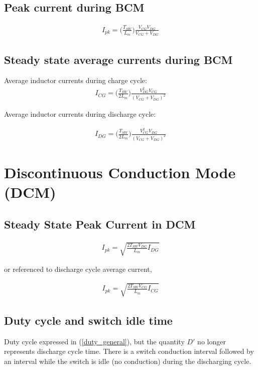 \documentclass{scrartcl}
\begin{document}
		\subsection{Peak current during BCM}
		
			\begin{align}
			I_{pk} = \bigg(\frac{T_{SW}}{L_m}\bigg)\frac{V_{CG}V_{DG}}{V_{CG} + V_{DG}} 
			\end{align}	
			
		\subsection{Steady state average currents during BCM}
			Average inductor currents during charge cycle:
			\begin{align}
			I_{CG} = \bigg(\frac{T_{SW}}{2L_m}\bigg)\frac{V_{DG}^2 V_{CG}}{(V_{CG} + V_{DG})^2} 
			\end{align}			

		   Average inductor currents during discharge cycle:

			\begin{align}
			I_{DG} = \bigg(\frac{T_{SW}}{2L_m}\bigg)\frac{V_{CG}^2 V_{DG}}{(V_{CG} + V_{DG})^2} 
			\end{align}		

	\section{Discontinuous Conduction Mode (DCM)}
	
		\subsection{Steady State Peak Current in DCM}
		
		\begin{align}
		I_{pk} = \sqrt{\frac{2T_{SW}V_{DG}}{L_m}I_{DG}}
		\end{align}	
		
		or referenced to discharge cycle average current,
	
		\begin{align}
		I_{pk} = \sqrt{\frac{2T_{SW}V_{CG}}{L_m}I_{CG}}
		\end{align}	
		
		\subsection{Duty cycle and switch idle time}
		Duty cycle expressed in (\ref{duty_general}), but the quantity $D'$ no longer represents discharge cycle time.  There is a switch conduction interval followed by an interval while the switch is idle (no conduction) during the discharging cycle.
		
\end{document}
